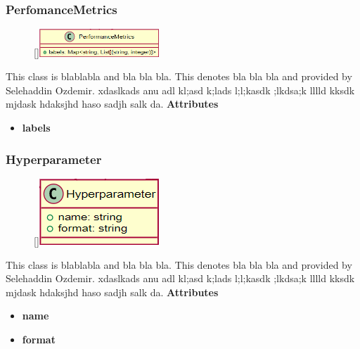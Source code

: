 \subsubsection{PerfomanceMetrics}
\begin{figure}
    \raisebox{0pt}[\dimexpr{}\baselineskip\relax]{\includegraphics[width=4.5cm]{classes/model-management/12.png}}
\end{figure} 
\par
This class is blablabla and bla bla bla. This denotes bla bla bla and provided by Selehaddin Ozdemir. xdaslkads anu adl kl;asd k;lads l;l;kasdk ;lkdsa;k lllld kksdk mjdask hdaksjhd haso sadjh salk da.
\newline
\newline
\textbf{Attributes}
\begin{itemize}
    \item \textbf{labels}
\end{itemize}

\subsubsection{Hyperparameter}
\begin{figure}
    \raisebox{0pt}[\dimexpr{}\baselineskip\relax]{\includegraphics[width=4.5cm]{classes/model-management/13.png}}
\end{figure} 
\par
This class is blablabla and bla bla bla. This denotes bla bla bla and provided by Selehaddin Ozdemir. xdaslkads anu adl kl;asd k;lads l;l;kasdk ;lkdsa;k lllld kksdk mjdask hdaksjhd haso sadjh salk da.
\newline
\newline
\textbf{Attributes}
\begin{itemize}
    \item \textbf{name}
    \item \textbf{format}
\end{itemize}

